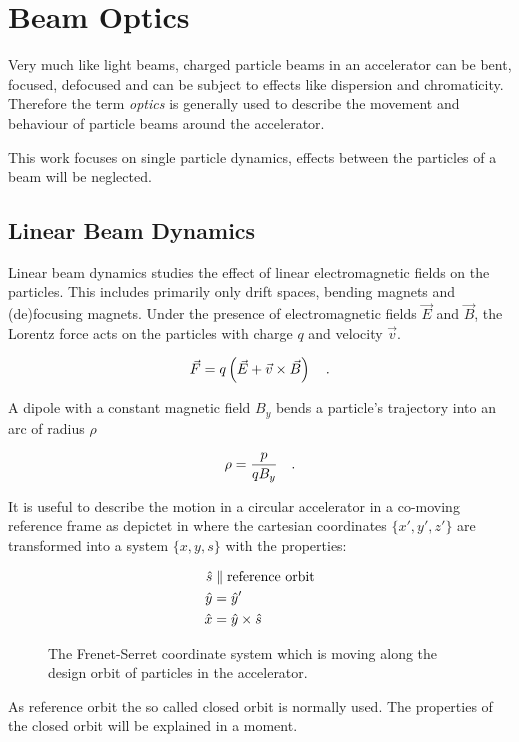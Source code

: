 \section{Beam Optics}

Very much like light beams, charged particle beams in an accelerator can be bent, focused, defocused
and can be subject to effects like dispersion and chromaticity. Therefore the term \emph{optics} is
generally used to describe the movement and behaviour of particle beams around the accelerator.

This work focuses on single particle dynamics, effects between the particles of a beam will be
neglected. 

\subsection{Linear Beam Dynamics}

Linear beam dynamics studies the effect of linear electromagnetic fields on the particles.
This includes primarily only drift spaces, bending magnets and (de)focusing magnets. Under the presence
of electromagnetic fields $\vec{E}$ and $\vec{B}$, the Lorentz force acts on the particles with charge
$q$ and velocity $\vec{v}$.

\begin{equation}
    \vec{F} = q\left(\vec{E} + \vec{v} \times \vec{B}\right)
    \quad .
    \label{eq_lorentz_force}
\end{equation}

A dipole with a constant magnetic field $B_y$ bends a particle's trajectory into an arc of radius $\rho$

\begin{equation}
    \rho = \frac{p}{qB_y}
    \quad .
    \label{eq_acc_radius}
\end{equation}

It is useful to describe the motion in a circular accelerator in a co-moving reference frame as
depictet in  where the cartesian coordinates $\{x', y', z'\}$ are
transformed into a system $\{x,y,s\}$ with the properties:

\begin{align}
    \hat{s} &\parallel \text{reference orbit}\notag\\
    \hat{y} &= \hat{y}'\notag\\
    \hat{x} &= \hat{y} \times \hat{s}
\end{align}


\begin{figure}[h]
    
    \caption{
        The Frenet-Serret coordinate system which is moving along the design orbit of particles
        in the accelerator.
    }
    \label{fig_frenet_serret}
\end{figure}
As reference orbit the so called closed orbit is normally used. The properties of the closed orbit
will be explained in a moment.

